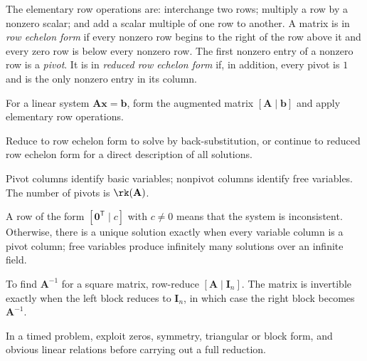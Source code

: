     \begin{definition}
        The elementary row operations are: interchange two rows; multiply a row
        by a nonzero scalar; and add a scalar multiple of one row to another.
        A matrix is in \emph{row echelon form} if every nonzero row begins to the
        right of the row above it and every zero row is below every nonzero row.
        The first nonzero entry of a nonzero row is a \emph{pivot}. It is in
        \emph{reduced row echelon form} if, in addition, every pivot is $1$ and
        is the only nonzero entry in its column.
    \end{definition}

    \begin{algorithm}
        For a linear system $\mathbf{A}\mathbf{x}=\mathbf{b}$, form the
        augmented matrix $[\mathbf{A}\mid\mathbf{b}]$ and apply elementary row
        operations.
        \begin{bookitems}
            \item Reduce to row echelon form to solve by back-substitution, or
                  continue to reduced row echelon form for a direct description
                  of all solutions.
            \item Pivot columns identify basic variables; nonpivot columns
                  identify free variables. The number of pivots is
                  $\rk(\mathbf{A})$.
            \item A row of the form
                  $[\mathbf{0}^{\mathsf T}\mid c]$ with $c\neq0$ means that the
                  system is inconsistent. Otherwise, there is a unique solution
                  exactly when every variable column is a pivot column; free
                  variables produce infinitely many solutions over an infinite
                  field.
            \item To find $\mathbf{A}^{-1}$ for a square matrix, row-reduce
                  $[\mathbf{A}\mid\mathbf{I}_n]$. The matrix is invertible
                  exactly when the left block reduces to $\mathbf{I}_n$, in
                  which case the right block becomes $\mathbf{A}^{-1}$.
        \end{bookitems}
        In a timed problem, exploit zeros, symmetry, triangular or block form,
        and obvious linear relations before carrying out a full reduction.
    \end{algorithm}

